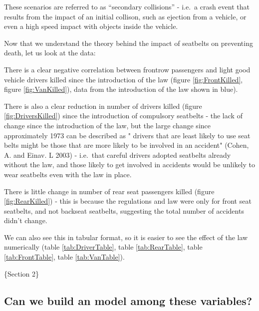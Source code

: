 \documentclass[11pt,a4paper,]{article}
\begin{document}
These scenarios are referred to as ``secondary collisions'' - i.e.~a crash event that results from the impact of an initial collison, such as ejection from a vehicle, or even a high speed impact with objects inside the vehicle.

Now that we understand the theory behind the impact of seatbelts on preventing death, let us look at the data:

There is a clear negative correlation between frontrow passengers and light good vehicle drivers killed since the introduction of the law (figure \ref{fig:FrontKilled}, figure \ref{fig:VanKilled}), data from the introduction of the law shown in blue).

There is also a clear reduction in number of drivers killed (figure \ref{fig:DriversKilled}) since the introduction of compulsory seatbelts - the lack of change since the introduction of the law, but the large change since approximately 1973 can be described as " drivers that are least likely to use seat belts might be those that are more likely to be involved in an accident" (Cohen, A. and Einav. L 2003) - i.e.~that careful drivers adopted seatbelts already without the law, and those likely to get involved in accidents would be unlikely to wear seatbelts even with the law in place.

There is little change in number of rear seat passengers killed (figure \ref{fig:RearKilled}) - this is because the regulations and law were only for front seat seatbelts, and not backseat seatbelts, suggesting the total number of accidents didn't change.

We can also see this in tabular format, so it is easier to see the effect of the law numerically (table \ref{tab:DriverTable}, table \ref{tab:RearTable}, table \ref{tab:FrontTable}, table \ref{tab:VanTable}).

\{Section 2\}

\hypertarget{can-we-build-an-model-among-these-variables}{%
\subsection{Can we build an model among these variables?}\label{can-we-build-an-model-among-these-variables}}
\end{document}
